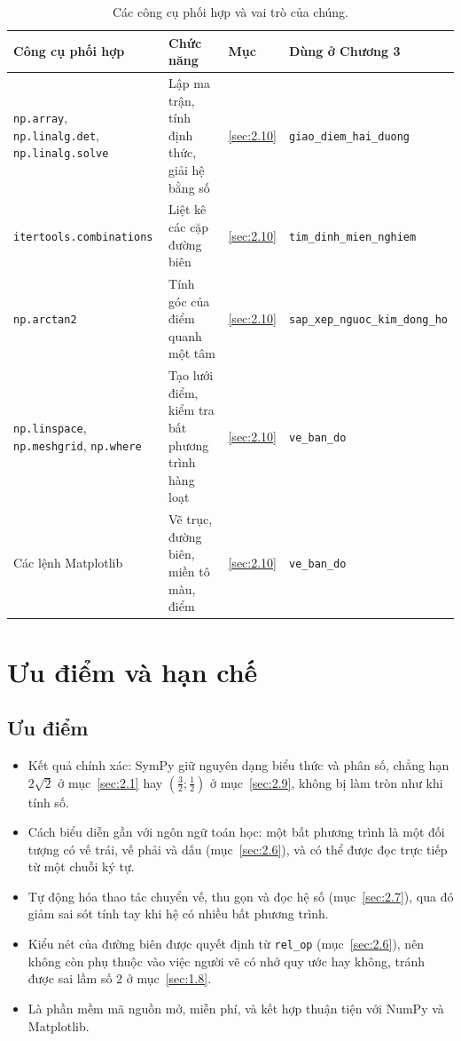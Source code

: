 \documentclass[12pt,a4paper]{report}
\begin{document}
\begin{table}[H]
\centering
\footnotesize
\begin{tabular}{@{}>{\raggedright\arraybackslash}p{4.2cm}>{\raggedright\arraybackslash}p{4.1cm}>{\raggedright\arraybackslash}p{1.3cm}>{\raggedright\arraybackslash}p{4.9cm}@{}}
\toprule
Công cụ phối hợp & Chức năng & Mục & Dùng ở Chương 3 \\
\midrule
\texttt{np.array}, \texttt{np.linalg.det}, \texttt{np.linalg.solve} & Lập ma trận, tính định thức, giải hệ bằng số & \ref{sec:2.10} & \texttt{giao\_diem\_hai\_duong} \\
\texttt{itertools.\allowbreak combinations} & Liệt kê các cặp đường biên & \ref{sec:2.10} & \texttt{tim\_dinh\_mien\_nghiem} \\
\texttt{np.arctan2} & Tính góc của điểm quanh một tâm & \ref{sec:2.10} & \texttt{sap\_xep\_nguoc\_\allowbreak kim\_dong\_ho} \\
\texttt{np.linspace}, \texttt{np.meshgrid}, \texttt{np.where} & Tạo lưới điểm, kiểm tra bất phương trình hàng loạt & \ref{sec:2.10} & \texttt{ve\_ban\_do} \\
Các lệnh Matplotlib & Vẽ trục, đường biên, miền tô màu, điểm & \ref{sec:2.10} & \texttt{ve\_ban\_do} \\
\bottomrule
\end{tabular}
\caption{Các công cụ phối hợp và vai trò của chúng.}
\label{tab:lenh-phoihop}
\end{table}

\section{Ưu điểm và hạn chế}
\label{sec:2.12}

\subsection*{Ưu điểm}

\begin{itemize}
\item Kết quả chính xác: SymPy giữ nguyên dạng biểu thức và phân số, chẳng hạn $2\sqrt{2}$ ở mục~\ref{sec:2.1} hay $\left(\frac{3}{2};\frac{1}{2}\right)$ ở mục~\ref{sec:2.9}, không bị làm tròn như khi tính số.
\item Cách biểu diễn gần với ngôn ngữ toán học: một bất phương trình là một đối tượng có vế trái, vế phải và dấu (mục~\ref{sec:2.6}), và có thể được đọc trực tiếp từ một chuỗi ký tự.
\item Tự động hóa thao tác chuyển vế, thu gọn và đọc hệ số (mục~\ref{sec:2.7}), qua đó giảm sai sót tính tay khi hệ có nhiều bất phương trình.
\item Kiểu nét của đường biên được quyết định từ \texttt{rel\_op} (mục~\ref{sec:2.6}), nên không còn phụ thuộc vào việc người vẽ có nhớ quy ước hay không, tránh được sai lầm số 2 ở mục~\ref{sec:1.8}.
\item Là phần mềm mã nguồn mở, miễn phí, và kết hợp thuận tiện với NumPy và Matplotlib.
\end{itemize}
\end{document}
